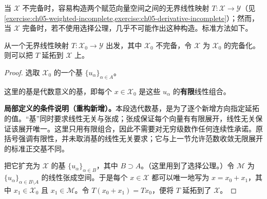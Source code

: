 \documentclass[../../main.tex]{subfiles}
\begin{document}
当 $\mathscr X$ 不完备时，容易构造两个赋范向量空间之间的无界线性映射 $T:\mathscr X\to\mathscr Y$（见\cref{exercise:ch05-weighted-incomplete,exercise:ch05-derivative-incomplete}）；然而，当 $\mathscr X$ 完备时，若不使用选择公理，几乎不可能作出这种构造。标准方法如下。
\begin{proposition}\label{proposition:ch05-unbounded-completion-extension}
从一个无界线性映射 $T:\mathscr X_0\to\mathscr Y$ 出发，其中 $\mathscr X_0$ 不完备，令 $\mathscr X$ 为 $\mathscr X_0$ 的完备化。则可以把 $T$ 延拓到 $\mathscr X$ 上。
\end{proposition}
\begin{proof}
选取 $\mathscr X_0$ 的一个基 $\{u_\alpha\}_{\alpha\in A}$。
\begin{definition*}[本段中的基]\label{definition:ch05-hamel-basis-notes}
这里的基是代数意义的基，即每个 $x\in\mathscr X_0$ 是这些 $u_\alpha$ 的\textbf{有限}线性组合。
\end{definition*}
\begin{remark}
\textbf{局部定义的条件说明（重构新增）。}本段选代数基，是为了逐个新增方向指定延拓的值。“基”同时要求线性无关与张成；张成保证每个向量有有限展开，线性无关保证该展开唯一。这里只用有限组合，因此不需要对无穷级数作任何连续性承诺。原括号强调有限性，并未取消基的线性无关要求；它与上一节允许范数收敛无限展开的标准正交基不同。
\end{remark}
把它扩充为 $\mathscr X$ 的基 $\{u_\alpha\}_{\alpha\in B}$，其中 $B\supset A$。（这里用到了选择公理。）令 $\mathscr M$ 为 $\{u_\alpha\}_{\alpha\in B\setminus A}$ 的线性张成空间。于是每个 $x\in\mathscr X$ 都可以唯一地写为 $x=x_0+x_1$，其中 $x_1\in\mathscr X_0$ 且 $x_1\in\mathscr M$。令 $T(x_0+x_1)=Tx_0$，便将 $T$ 延拓到了 $\mathscr X$。
\end{proof}
\end{document}

